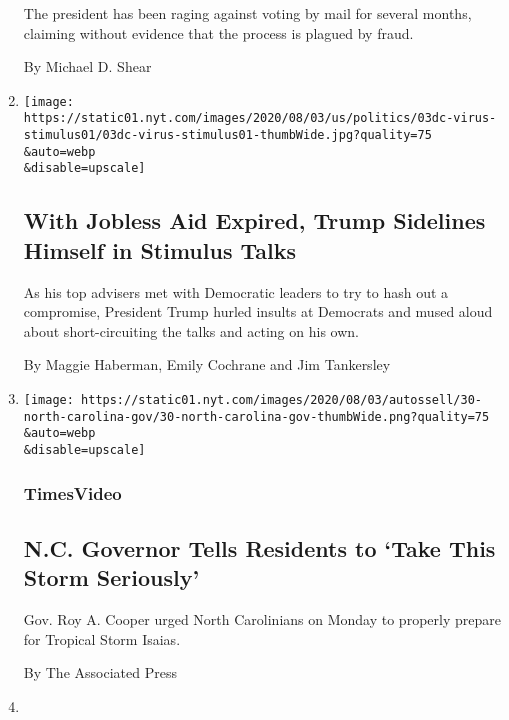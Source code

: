 \begin{enumerate}
  The president has been raging against voting by mail for several
  months, claiming without evidence that the process is plagued by
  fraud.

  By Michael D. Shear
\item
  \href{/2020/08/03/us/politics/congress-jobless-aid-talks-trump.html}{}

  \texttt{[image: https://static01.nyt.com/images/2020/08/03/us/politics/03dc-virus-stimulus01/03dc-virus-stimulus01-thumbWide.jpg?quality=75\\\&auto=webp\\\&disable=upscale]}

  \hypertarget{with-jobless-aid-expired-trump-sidelines-himself-in-stimulus-talks}{%
  \subsection{With Jobless Aid Expired, Trump Sidelines Himself in
  Stimulus
  Talks}\label{with-jobless-aid-expired-trump-sidelines-himself-in-stimulus-talks}}

  As his top advisers met with Democratic leaders to try to hash out a
  compromise, President Trump hurled insults at Democrats and mused
  aloud about short-circuiting the talks and acting on his own.

  By Maggie Haberman, Emily Cochrane and Jim Tankersley
\item
  \href{/video/us/100000007271090/north-carolina-isaias-coronavirus.html}{}

  \texttt{[image: https://static01.nyt.com/images/2020/08/03/autossell/30-north-carolina-gov/30-north-carolina-gov-thumbWide.png?quality=75\\\&auto=webp\\\&disable=upscale]}

  \hypertarget{timesvideo-1}{%
  \subsubsection{TimesVideo}\label{timesvideo-1}}

  \hypertarget{nc-governor-tells-residents-to-take-this-storm-seriously}{%
  \subsection{N.C. Governor Tells Residents to `Take This Storm
  Seriously'}\label{nc-governor-tells-residents-to-take-this-storm-seriously}}

  Gov. Roy A. Cooper urged North Carolinians on Monday to properly
  prepare for Tropical Storm Isaias.

  By The Associated Press
\item
  \href{/2020/08/03/us/politics/joe-biden-vp.html}{}


\end{enumerate}
